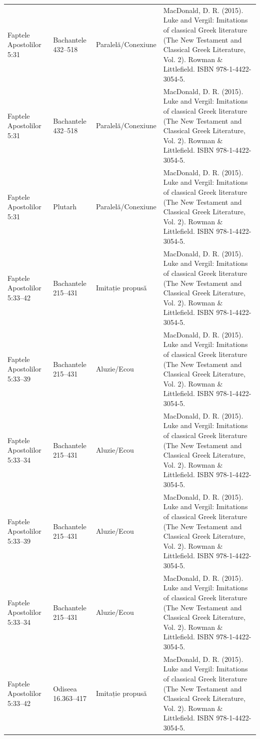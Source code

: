 \documentclass[12pt,a4paper,twoside,openany]{book}
\begin{document}
\begin{longtable}{L{1.4cm}L{1.7cm}L{3.1cm}L{8.4cm}}
Faptele Apostolilor 5:31 & Bachantele 432–518 & Paralelă/Conexiune & MacDonald, D. R. (2015). Luke and Vergil: Imitations of classical Greek literature (The New Testament and Classical Greek Literature, Vol. 2). Rowman \& Littlefield. ISBN 978-1-4422-3054-5. \\
Faptele Apostolilor 5:31 & Bachantele 432–518 & Paralelă/Conexiune & MacDonald, D. R. (2015). Luke and Vergil: Imitations of classical Greek literature (The New Testament and Classical Greek Literature, Vol. 2). Rowman \& Littlefield. ISBN 978-1-4422-3054-5. \\
Faptele Apostolilor 5:31 & Plutarh & Paralelă/Conexiune & MacDonald, D. R. (2015). Luke and Vergil: Imitations of classical Greek literature (The New Testament and Classical Greek Literature, Vol. 2). Rowman \& Littlefield. ISBN 978-1-4422-3054-5. \\
Faptele Apostolilor 5:33–42 & Bachantele 215–431 & Imitație propusă & MacDonald, D. R. (2015). Luke and Vergil: Imitations of classical Greek literature (The New Testament and Classical Greek Literature, Vol. 2). Rowman \& Littlefield. ISBN 978-1-4422-3054-5. \\
Faptele Apostolilor 5:33–39 & Bachantele 215–431 & Aluzie/Ecou & MacDonald, D. R. (2015). Luke and Vergil: Imitations of classical Greek literature (The New Testament and Classical Greek Literature, Vol. 2). Rowman \& Littlefield. ISBN 978-1-4422-3054-5. \\
Faptele Apostolilor 5:33–34 & Bachantele 215–431 & Aluzie/Ecou & MacDonald, D. R. (2015). Luke and Vergil: Imitations of classical Greek literature (The New Testament and Classical Greek Literature, Vol. 2). Rowman \& Littlefield. ISBN 978-1-4422-3054-5. \\
Faptele Apostolilor 5:33–39 & Bachantele 215–431 & Aluzie/Ecou & MacDonald, D. R. (2015). Luke and Vergil: Imitations of classical Greek literature (The New Testament and Classical Greek Literature, Vol. 2). Rowman \& Littlefield. ISBN 978-1-4422-3054-5. \\
Faptele Apostolilor 5:33–34 & Bachantele 215–431 & Aluzie/Ecou & MacDonald, D. R. (2015). Luke and Vergil: Imitations of classical Greek literature (The New Testament and Classical Greek Literature, Vol. 2). Rowman \& Littlefield. ISBN 978-1-4422-3054-5. \\
Faptele Apostolilor 5:33–42 & Odiseea 16.363–417 & Imitație propusă & MacDonald, D. R. (2015). Luke and Vergil: Imitations of classical Greek literature (The New Testament and Classical Greek Literature, Vol. 2). Rowman \& Littlefield. ISBN 978-1-4422-3054-5. \\

\end{longtable}
\end{document}

